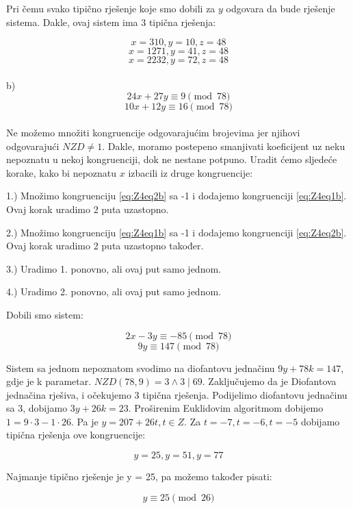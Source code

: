 \documentclass[12pt]{article}
\begin{document}
Pri čemu svako tipično rješenje koje smo dobili za $y$ odgovara da bude rješenje sistema. Dakle, ovaj sistem ima 3 tipična rješenja:

$$x = 310, y = 10, z = 48$$ 
$$x = 1271, y = 41, z = 48$$
$$x = 2232, y = 72, z = 48$$\vspace{1mm}
\\
b)
\[
24x + 27y \equiv 9 \pmod{78} \label{eq:Z4eq1b} \tag{1}
\]
\[
10x + 12y \equiv 16 \pmod{78} \label{eq:Z4eq2b} \tag{2}
\]
\\

Ne možemo množiti kongruencije odgovarajućim brojevima jer njihovi odgovarajući $NZD \neq 1$. Dakle, moramo postepeno smanjivati koeficijent uz neku nepoznatu u nekoj kongruenciji, dok ne nestane potpuno. Uradit ćemo sljedeće korake, kako bi nepoznatu $x$ izbacili iz druge kongruencije:\vspace{1mm}

\begin{center}
1.) Množimo kongruenciju \ref{eq:Z4eq2b} sa -1 i dodajemo kongruenciji \ref{eq:Z4eq1b}. Ovaj korak uradimo 2 puta uzastopno.


2.) Množimo kongruenciju \ref{eq:Z4eq1b} sa -1 i dodajemo kongruenciji \ref{eq:Z4eq2b}. Ovaj korak uradimo 2 puta uzastopno također.


3.) Uradimo 1. ponovno, ali ovaj put samo jednom.


4.) Uradimo 2. ponovno, ali ovaj put samo jednom.
\end{center}

Dobili smo sistem:

$$2x - 3y \equiv -85 \pmod{78}$$
$$9y \equiv 147 \pmod{78}$$\vspace{1mm}

Sistem sa jednom nepoznatom svodimo na diofantovu jednačinu $9y + 78k = 147$, gdje je k parametar. $NZD(78, 9) = 3 \land 3 \mid 69$. Zaključujemo da je Diofantova jednačina rješiva, i očekujemo 3 tipična rješenja. Podijelimo diofantovu jednačinu sa 3, dobijamo $3y + 26k = 23$. Proširenim Euklidovim algoritmom dobijemo $1 = 9 \cdot 3 - 1 \cdot 26$. Pa je $y = 207 + 26t, t \in Z$. Za $t = -7, t = -6, t = -5$ dobijamo tipična rješenja ove kongruencije:

$$y = 25, y = 51, y = 77$$\vspace{1mm}

Najmanje tipično rješenje je y = 25, pa možemo također pisati:

$$y \equiv 25 \pmod{26}$$ \vspace{1mm}
\end{document}
